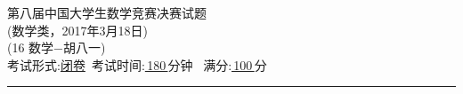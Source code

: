 \documentclass[UTF8]{ctexart}
\begin{document}
	\begin{center}
		{\xingkai 第八届中国大学生数学竞赛决赛试题}\\[1.5mm]
		{ (数学类，2017年3月18日)}\\[2mm]
		 (16 数学$-$胡八一)\\[3mm]
		{考试形式:\underline{\;闭卷\;}\quad\, 考试时间:\underline{\;\;\,180\;\;\,}分钟   \quad\, 满分:\underline{\;\;\,100\;\;\,}分}
	\end{center}
	\vspace*{-7mm}\rule{\textwidth}{0.1pt}%
	\newcommand{\blank}{\underline{\hspace{2cm}}}
	\setlength{\topsep}{1ex}%
	\setlength{\itemsep}{-2mm}%
\end{document}

